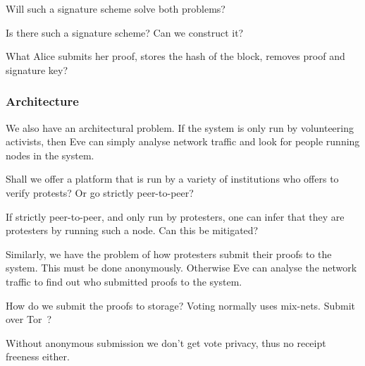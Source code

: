 \begin{frame}
  \begin{question}
    Will such a signature scheme solve both problems?
  \end{question}
  \begin{question}
    Is there such a signature scheme?
    Can we construct it?
  \end{question}
  \begin{question}
    What Alice submits her proof, stores the hash of the block, removes proof 
    and signature key?
  \end{question}
\end{frame}

\subsubsection{Architecture}

We also have an architectural problem.
If the system is only run by volunteering activists, then Eve can simply 
analyse network traffic and look for people running nodes in the system.

\begin{frame}
  \begin{question}
    Shall we offer a platform that is run by a variety of institutions who 
    offers to verify protests?
    Or go strictly peer-to-peer?
  \end{question}
  \begin{question}
    If strictly peer-to-peer, and only run by protesters, one can infer that 
    they are protesters by running such a node.
    Can this be mitigated?
  \end{question}
\end{frame}

Similarly, we have the problem of how protesters submit their proofs to the 
system.
This must be done anonymously.
Otherwise Eve can analyse the network traffic to find out who submitted proofs 
to the system.

\begin{frame}
  \begin{question}
    How do we submit the proofs to storage?
    Voting normally uses mix-nets.
    Submit over Tor~\cite{Tor}?
  \end{question}

  \begin{remark}
    Without anonymous submission we don't get vote privacy, thus no receipt 
    freeness either.
  \end{remark}
\end{frame}

